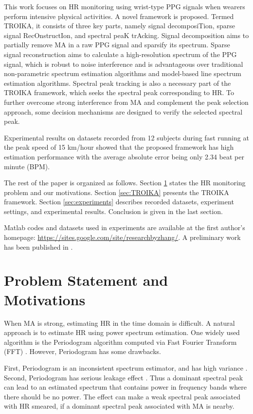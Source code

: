 \documentclass[10pt,twocolumn]{IEEEtran}
\begin{document}
This work focuses on HR monitoring using wrist-type PPG signals when wearers perform intensive physical activities. A
novel framework is proposed. Termed TROIKA, it consists of three key parts, namely signal decomposiTion, sparse signal RecOnstructIon, and spectral peaK trAcking. Signal decomposition aims to partially remove MA in a raw PPG signal and sparsify its spectrum. Sparse signal reconstruction aims to calculate a high-resolution spectrum of the PPG signal, which is robust to noise interference and is advantageous over traditional non-parametric spectrum estimation algorithms and model-based line spectrum estimation algorithms. Spectral peak tracking is also a necessary part of the TROIKA framework, which seeks the spectral peak corresponding to HR. To further overcome strong interference from MA and complement the peak selection approach, some decision mechanisms are designed to verify the selected spectral peak.

Experimental results on datasets recorded from 12 subjects during fast running at the peak speed of 15 km/hour showed that the proposed framework has high estimation performance with the average absolute error being only 2.34 beat per minute (BPM).


The rest of the paper is organized as follows. Section \ref{sec:motivation} states the HR monitoring problem and our motivations. Section \ref{sec:TROIKA} presents the TROIKA framework. Section \ref{sec:experiments} describes recorded datasets, experiment settings, and experimental results. Conclusion is given in the last section.

Matlab codes and datasets used in experiments are available at the first author's homepage: \url{https://sites.google.com/site/researchbyzhang/}. A preliminary work has been published in \cite{Zhang2014GlobalSIP}.


\section{Problem Statement and Motivations}
\label{sec:motivation}

When MA is strong, estimating HR in the time domain is difficult. A natural approach is to estimate HR using power spectrum estimation. One widely used algorithm is the Periodogram algorithm computed via Fast Fourier Transform (FFT) \cite{stoica2005spectral}. However, Periodogram has some drawbacks.

First, Periodogram is an inconsistent spectrum estimator, and has high variance \cite{stoica2005spectral}. Second, Periodogram has serious leakage effect \cite{stoica2005spectral}. Thus a dominant spectral peak can lead to an estimated spectrum that contains power in frequency bands where there should be no power. The effect can make a weak spectral peak associated with HR smeared, if a dominant spectral peak associated with MA is nearby.
\end{document}
